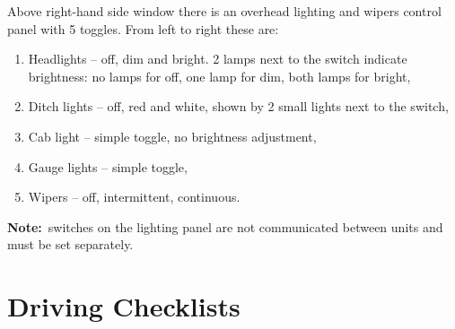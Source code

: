 \documentclass[11pt, a4paper]{article}
\newcommand{\note}{\textbf{Note:}}
\begin{document}
Above right-hand side window there is an overhead lighting and wipers control panel with 5 toggles. From left to right these are:
\begin{enumerate}
\item Headlights -- off, dim and bright. 2 lamps next to the switch indicate brightness: no lamps for off, one lamp for dim, both lamps for bright,
\item Ditch lights -- off, red and white, shown by 2 small lights next to the switch,
\item Cab light -- simple toggle, no brightness adjustment,
\item Gauge lights -- simple toggle,
\item Wipers -- off, intermittent, continuous.
\end{enumerate}
\note\ switches on the lighting panel are not communicated between units and must be set separately.
\newpage

\section{Driving Checklists}
\end{document}

